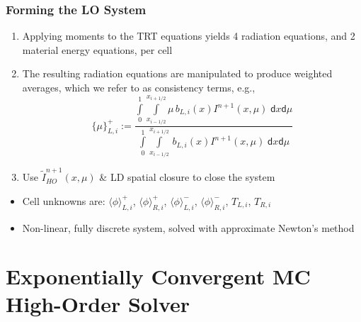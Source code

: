 \documentclass[xcolor=dvipsnames,hyperref={pdfpagelabels=false},unknownkeysallowed]{beamer}
\newcommand{\colb}[1]{{\color{blue} #1}}
\newlength{\wideitemsep}
\let\olditem\item
\renewcommand{\item}{\setlength{\itemsep}{\wideitemsep}\olditem}
\renewcommand{\d}{\mathsf{d}}
\newcommand{\mom}[1]{\langle #1 \rangle}
\newcommand{\xl}{{x_{i-1/2}}}
\newcommand{\xr}{{x_{i+1/2}}}
\begin{document}
\begin{frame}
    \frametitle{Forming the LO System}
    \vspace{-0.1in}
    {\small
    \begin{enumerate}
      \item Applying moments to the TRT equations yields 4 radiation equations, and 2 material energy
          equations, per cell \vspace{-0.062in}
    \item The resulting radiation equations are  manipulated to produce weighted
        averages, which we refer to as \colb{consistency
          terms}, e.g.,
    \begin{equation*}
\{{\mu}\}_{L,i}^{+} := \frac{\displaystyle 
    \int\limits_0^1 \int\limits_\xl^\xr \mu \, b_{L,i}(x) 
I^{n+1}(x,\mu) \;\d x \d \mu } 
{\displaystyle \int\limits_0^1 \int\limits_\xl^\xr \, b_{L,i}(x)
I^{n+1}(x,\mu)\; \d x \d \mu} 
    \end{equation*}
    \vspace{-0.1in}
\item Use \colb{$\tilde{I}_{HO}^{n+1}(x,\mu)$} \& LD spatial closure to close the system
    \end{enumerate}
    \begin{itemize}
            
        \item Cell unknowns are: $\mom{\phi}_{L,i}^{+}$, $\mom{\phi}_{R,i}^{+}$,
        $\mom{\phi}_{L,i}^{-}$, $\mom{\phi}_{R,i}^{-}$, $T_{L,i}$, $T_{R,i}$
     \item Non-linear, fully discrete system, solved with approximate Newton's method
 \end{itemize}


}
\end{frame}



\section{Exponentially Convergent MC High-Order Solver}
\subsection{}
\end{document}
